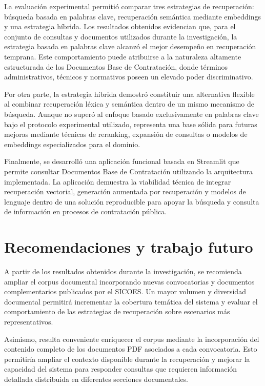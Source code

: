 La evaluación experimental permitió comparar tres estrategias de recuperación: búsqueda basada en palabras clave, recuperación semántica mediante embeddings y una estrategia híbrida. Los resultados obtenidos evidencian que, para el conjunto de consultas y documentos utilizados durante la investigación, la estrategia basada en palabras clave alcanzó el mejor desempeño en recuperación temprana. Este comportamiento puede atribuirse a la naturaleza altamente estructurada de los Documentos Base de Contratación, donde términos administrativos, técnicos y normativos poseen un elevado poder discriminativo.

Por otra parte, la estrategia híbrida demostró constituir una alternativa flexible al combinar recuperación léxica y semántica dentro de un mismo mecanismo de búsqueda. Aunque no superó al enfoque basado exclusivamente en palabras clave bajo el protocolo experimental utilizado, representa una base sólida para futuras mejoras mediante técnicas de reranking, expansión de consultas o modelos de embeddings especializados para el dominio.

Finalmente, se desarrolló una aplicación funcional basada en Streamlit que permite consultar Documentos Base de Contratación utilizando la arquitectura implementada. La aplicación demuestra la viabilidad técnica de integrar recuperación vectorial, generación aumentada por recuperación y modelos de lenguaje dentro de una solución reproducible para apoyar la búsqueda y consulta de información en procesos de contratación pública.

\section{Recomendaciones y trabajo futuro}


A partir de los resultados obtenidos durante la investigación, se recomienda ampliar el corpus documental incorporando nuevas convocatorias y documentos complementarios publicados por el SICOES. Un mayor volumen y diversidad documental permitirá incrementar la cobertura temática del sistema y evaluar el comportamiento de las estrategias de recuperación sobre escenarios más representativos.

Asimismo, resulta conveniente enriquecer el corpus mediante la incorporación del contenido completo de los documentos PDF asociados a cada convocatoria. Esto permitiría ampliar el contexto disponible durante la recuperación y mejorar la capacidad del sistema para responder consultas que requieren información detallada distribuida en diferentes secciones documentales.

